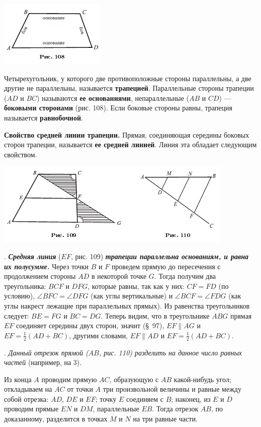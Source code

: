 \documentclass[oneside]{book}
\begin{document}
\includegraphics{pics/ris-108}

Четырехугольник, у которого две противоположные стороны параллельны, а две другие не параллельны, называется \textbf{трапецией}.
Параллельные стороны трапеции ($AD$ и $BC$) называются \textbf{ее основаниями}, непараллельные ($AB$ и $CD$) — \textbf{боковыми сторонами} (рис. 108).
Если боковые стороны равны, трапеция называется \textbf{равнобочной}.

\textbf{Свойство средней линии трапеции.}
Прямая, соединяющая середины боковых сторон трапеции, называется \textbf{ее средней линией}.
Линия эта обладает следующим свойством.

\includegraphics{pics/ris-109-110}

.
\textbf{\emph{Средняя линия}} ($EF$, рис. 109) \textbf{\emph{трапеции параллельна основаниям, и равна их полусумме.}}
Через точки $B$ и $F$ проведем прямую до пересечения с продолжением стороны $AD$ в некоторой точке $G$.
Тогда получим два треугольника:
$BCF$ и $DFG$, которые равны, так как у них:
$CF=FD$ (по условию), $\angle BFC=\angle DFG$ (как углы вертикальные) и $\angle BCF = \angle FDG$ (как углы накрест лежащие при параллельных прямых).
Из равенства треугольников следует:
$BE=FG$ и $BC=DG$.
Теперь видим, что в треугольнике $ABG$ прямая $EF$ соединяет середины двух сторон, значит (§~97), $EF \parallel AG$ и $EF = \tfrac12(AD+BC)$, другими словами, $EF\parallel AD$ и $EF = \tfrac12(AD + BC)$.



.
\emph{Данный отрезок прямой \emph{($AB$, рис. 110)} разделить на данное число равных частей} (например, на 3).

Из конца $A$ проводим прямую $AC$, образующую с $AB$ какой-нибудь угол;
откладываем на $AC$ от точки $A$ три произвольной величины и равные между собой отрезка:
$AD$, $DE$ и $EF$;
точку $E$ соединяем с $B$;
наконец, из $E$ и $D$ проводим прямые $EN$ и $DM$, параллельные $EB$.
Тогда отрезок $AB$, по доказанному, разделится в точках $M$ и $N$ на три равные части.
\end{document}
